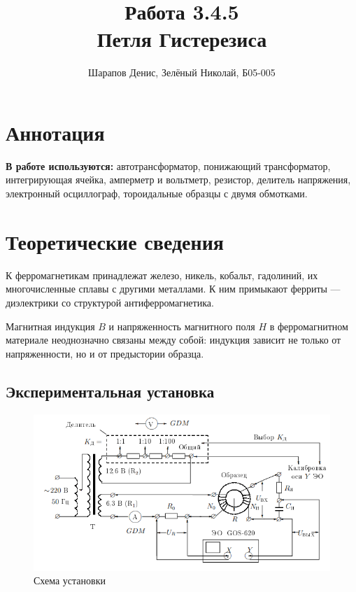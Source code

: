\documentclass[a4paper]{article}
\title{Работа 3.4.5 \\ Петля Гистерезиса}
\author{Шарапов Денис, Зелёный Николай, Б05-005}
\date{}
\theoremstyle{definition}
\theoremstyle{remark}
\begin{document}
    \maketitle
    \tableofcontents
    \newpage
    
\section{Аннотация}

\noindent \textbf{В работе используются:} автотрансформатор, понижающий трансформатор, интегрирующая ячейка, амперметр и вольтметр, резистор, делитель напряжения, электронный осциллограф, тороидальные образцы с двумя обмотками.
 
\section{Теоретические сведения}

К ферромагнетикам принадлежат железо, никель, кобальт, гадолиний, их многочисленные сплавы с другими металлами. К ним примыкают ферриты --- диэлектрики со структурой антиферромагнетика. \medskip

\noindent Магнитная индукция \textbf{$B$} и напряженность магнитного поля \textbf{$H$} в ферромагнитном материале неоднозначно связаны между собой: индукция зависит не только от напряженности, но и от предыстории образца.

\subsection{Экспериментальная установка}

\begin{figure}[h!]
    \centering
    \includegraphics[width=\linewidth]{image/pic1.png}
    \caption{Схема установки}
\end{figure}
\end{document}
